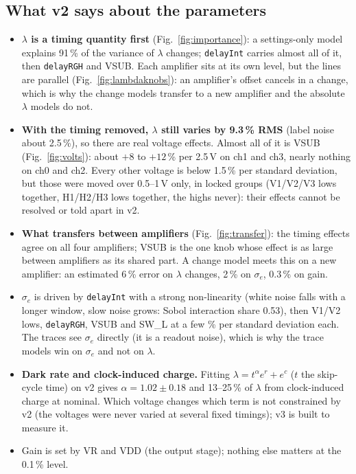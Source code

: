 \documentclass[11pt]{article}
\begin{document}
\subsection{What v2 says about the parameters}
\begin{itemize}
\item \textbf{$\lambda$ is a timing quantity first} (Fig.~\ref{fig:importance}): a settings-only model explains 91\,\% of the
  variance of $\lambda$ changes; \texttt{delayInt} carries almost all of it, then \texttt{delayRGH} and VSUB. Each
  amplifier sits at its own level, but the lines are parallel (Fig.~\ref{fig:lambdaknobs}): an amplifier's offset cancels
  in a change, which is why the change models transfer to a new amplifier and the absolute $\lambda$ models do not.
\item \textbf{With the timing removed, $\lambda$ still varies by 9.3\,\% RMS} (label noise about 2.5\,\%), so there are
  real voltage effects. Almost all of it is VSUB (Fig.~\ref{fig:volts}): about $+8$ to $+12$\,\% per 2.5\,V on ch1 and
  ch3, nearly nothing on ch0 and ch2. Every other voltage is below 1.5\,\% per standard deviation, but those were moved
  over 0.5--1\,V only, in locked groups (V1/V2/V3 lows together, H1/H2/H3 lows together, the highs never): their effects
  cannot be resolved or told apart in v2.
\item \textbf{What transfers between amplifiers} (Fig.~\ref{fig:transfer}): the timing effects agree on all four
  amplifiers; VSUB is the one knob whose effect is as large between amplifiers as its shared part. A change model
  meets this on a new amplifier: an estimated 6\,\% error on $\lambda$ changes, 2\,\% on $\sigma_e$, 0.3\,\% on gain.
\item \textbf{$\sigma_e$} is driven by \texttt{delayInt} with a strong non-linearity (white noise falls with a longer
  window, slow noise grows: Sobol interaction share 0.53), then V1/V2 lows, \texttt{delayRGH}, VSUB and SW\_L at a few
  \% per standard deviation each. The traces see $\sigma_e$ directly (it is a readout noise), which is why the trace
  models win on $\sigma_e$ and not on $\lambda$.
\item \textbf{Dark rate and clock-induced charge.} Fitting
  $\lambda = t^{\alpha} e^{r} + e^{c}$ ($t$ the skip-cycle time) on v2 gives $\alpha = 1.02 \pm 0.18$ and 13--25\,\% of
  $\lambda$ from clock-induced charge at nominal. Which voltage changes which term is not constrained by v2 (the voltages
  were never varied at several fixed timings); v3 is built to measure it.
\item Gain is set by VR and VDD (the output stage); nothing else matters at the 0.1\,\% level.
\end{itemize}
\end{document}
